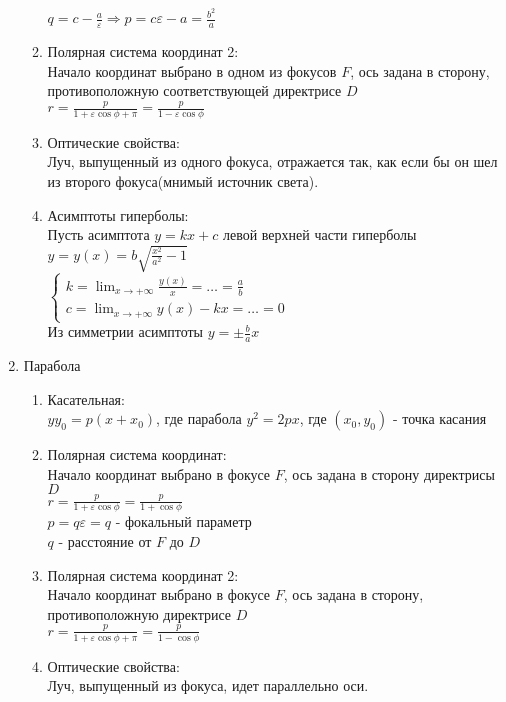 \documentclass[12pt]{article}
\begin{document}
\begin{enumerate}
\begin{enumerate}
        $q = c - \frac a\varepsilon \Rightarrow p=c\varepsilon - a = \frac{b^2}a$
        \item Полярная система координат 2:\\
        Начало координат выбрано в одном из фокусов $F$, ось задана в сторону, противоположную соответствующей директрисе $D$\\
        $r=\frac{p}{1+\varepsilon\cos\phi+\pi} = \frac{p}{1-\varepsilon\cos\phi}$
        \item Оптические свойства:\\
        Луч, выпущенный из одного фокуса, отражается так, как если бы он шел из второго фокуса(мнимый источник света).
        \item Асимптоты гиперболы:\\
        Пусть асимптота $y=kx+c$ левой верхней части гиперболы $y=y(x)=b\sqrt{\frac{x^2}{a^2}-1}$ \\
        $\left\{\begin{array}{l}
             k = \lim_{x\rightarrow +\infty} \frac{y(x)}x = \ldots = \frac ab \\
             c = \lim_{x\rightarrow +\infty} y(x)-kx = \ldots = 0
        \end{array}\right.$\\
        Из симметрии асимптоты $y=\pm\frac bax$
    \end{enumerate}
    \item Парабола
    \begin{enumerate}
        \item Касательная:\\
        $yy_0=p(x+x_0)$, где парабола  $y^2=2px$, где $(x_0, y_0)$ - точка касания
        \item Полярная система координат:\\
        Начало координат выбрано в фокусе $F$, ось задана в сторону директрисы $D$\\
        $r=\frac{p}{1+\varepsilon\cos\phi} = \frac{p}{1+\cos\phi}$\\
        $p = q\varepsilon = q$ - фокальный параметр\\
        $q$ - расстояние от $F$ до $D$
        \item Полярная система координат 2:\\
        Начало координат выбрано в фокусе $F$, ось задана в сторону, противоположную директрисе $D$\\
        $r=\frac{p}{1+\varepsilon\cos\phi+\pi} = \frac{p}{1-\cos\phi}$
        \item Оптические свойства:\\
        Луч, выпущенный из фокуса, идет параллельно оси.
    \end{enumerate}
    \end{enumerate}
\end{document}
